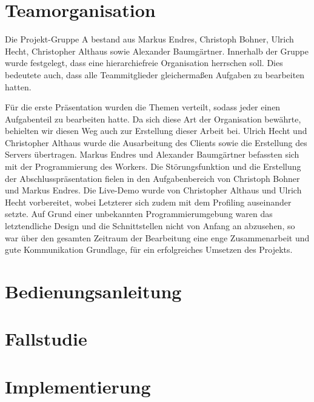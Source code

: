 \documentclass[10pt,a4paper]{article}
\begin{document}
\section{Teamorganisation}	%
Die Projekt-Gruppe A bestand aus Markus Endres, Christoph Bohner, Ulrich Hecht, Christopher Althaus sowie Alexander Baumgärtner. Innerhalb der Gruppe wurde festgelegt, dass eine hierarchiefreie Organisation herrschen soll. Dies bedeutete auch, dass alle Teammitglieder gleichermaßen Aufgaben zu bearbeiten hatten. 

Für die erste Präsentation wurden die Themen verteilt, sodass jeder einen Aufgabenteil zu bearbeiten hatte. Da sich diese Art der Organisation bewährte, behielten wir diesen Weg auch zur Erstellung dieser Arbeit bei. Ulrich Hecht und Christopher Althaus wurde die Ausarbeitung des Clients sowie die Erstellung des Servers übertragen. Markus Endres und Alexander Baumgärtner befassten sich mit der Programmierung des Workers. Die Störungsfunktion und die Erstellung der Abschlusspräsentation fielen in den Aufgabenbereich von Christoph Bohner und Markus Endres. Die Live-Demo wurde von Christopher Althaus und Ulrich Hecht vorbereitet, wobei Letzterer sich zudem mit dem Profiling auseinander setzte.  Auf Grund einer unbekannten Programmierumgebung waren das letztendliche Design und die Schnittstellen nicht von Anfang an abzusehen, so war über den gesamten Zeitraum der Bearbeitung eine enge Zusammenarbeit und gute Kommunikation Grundlage, für ein erfolgreiches Umsetzen des Projekts.
\newpage

\section{Bedienungsanleitung}

\section{Fallstudie}

\section{Implementierung}


\end{document}
